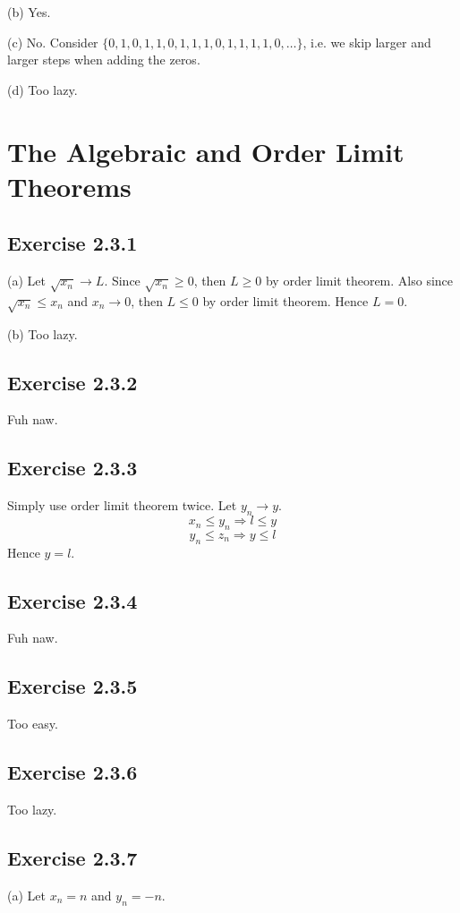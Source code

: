 \documentclass{book}
\begin{document}
\noindent
(b)
Yes.

\noindent
(c)
No. Consider $\{ 0, 1, 0, 1, 1, 0, 1, 1, 1, 0, 1, 1, 1, 1, 0, \ldots \}$, i.e. we skip larger and larger steps when adding the zeros.

\noindent
(d)
Too lazy.

\section{The Algebraic and Order Limit Theorems}

\subsection*{Exercise 2.3.1}
(a)
Let $\sqrt{x_n} \rightarrow L$. Since $\sqrt{x_n} \geq 0$, then $L \geq 0$ by order limit theorem. Also since $\sqrt{x_n} \leq x_n$ and $x_n \rightarrow 0$, then $L \leq 0$ by order limit theorem. Hence $L = 0$.

\noindent
(b)
Too lazy.

\subsection*{Exercise 2.3.2}
Fuh naw.

\subsection*{Exercise 2.3.3}
Simply use order limit theorem twice. Let $y_n \rightarrow y$.
$$x_n \leq y_n \Rightarrow l \leq y$$
$$y_n \leq z_n \Rightarrow y \leq l$$
Hence $y = l$.

\subsection*{Exercise 2.3.4}
Fuh naw.

\subsection*{Exercise 2.3.5}
Too easy.

\subsection*{Exercise 2.3.6}
Too lazy.

\subsection*{Exercise 2.3.7}
(a)
Let $x_n = n$ and $y_n = -n$.
\end{document}
